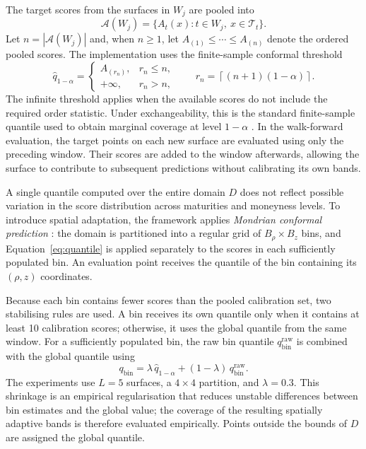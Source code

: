 The target scores from the surfaces in $W_j$ are pooled into
\begin{equation}
    \mathcal{A}(W_j)
    = \{A_t(x):t\in W_j,\ x\in\mathcal{T}_t\}.
\end{equation}
Let $n=|\mathcal{A}(W_j)|$ and, when $n\geq1$, let $A_{(1)}\leq\cdots\leq A_{(n)}$ denote the ordered pooled scores. The implementation uses the finite-sample conformal threshold
\begin{equation}
    \hat q_{1-\alpha}=
    \begin{cases}
        A_{(r_n)}, & r_n\leq n,\\
        +\infty, & r_n>n,
    \end{cases}
    \qquad
    r_n=\left\lceil(n+1)(1-\alpha)\right\rceil.
    \label{eq:quantile}
\end{equation}
The infinite threshold applies when the available scores do not include the required order statistic. Under exchangeability, this is the standard finite-sample quantile used to obtain marginal coverage at level $1-\alpha$ \cite{shafer2008tutorial,angelopoulos2023gentle}. In the walk-forward evaluation, the target points on each new surface are evaluated using only the preceding window. Their scores are added to the window afterwards, allowing the surface to contribute to subsequent predictions without calibrating its own bands.

A single quantile computed over the entire domain $D$ does not reflect possible variation in the score distribution across maturities and moneyness levels. To introduce spatial adaptation, the framework applies \textit{Mondrian conformal prediction} \cite{vovk2005algorithmic,shafer2008tutorial}: the domain is partitioned into a regular grid of $B_\rho\times B_z$ bins, and Equation~\ref{eq:quantile} is applied separately to the scores in each sufficiently populated bin. An evaluation point receives the quantile of the bin containing its $(\rho,z)$ coordinates.

Because each bin contains fewer scores than the pooled calibration set, two stabilising rules are used. A bin receives its own quantile only when it contains at least 10 calibration scores; otherwise, it uses the global quantile from the same window. For a sufficiently populated bin, the raw bin quantile $q^{\text{raw}}_{\text{bin}}$ is combined with the global quantile using
\begin{equation}
    q_{\text{bin}} = \lambda\, \hat{q}_{1-\alpha} + (1-\lambda)\, q^{\text{raw}}_{\text{bin}}.
    \label{eq:shrinkage}
\end{equation}
The experiments use $L=5$ surfaces, a $4\times4$ partition, and $\lambda=0.3$. This shrinkage is an empirical regularisation that reduces unstable differences between bin estimates and the global value; the coverage of the resulting spatially adaptive bands is therefore evaluated empirically. Points outside the bounds of $D$ are assigned the global quantile.

